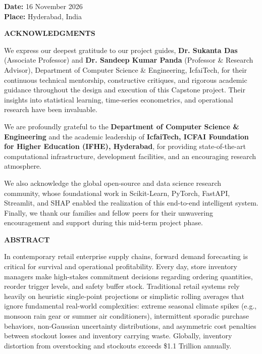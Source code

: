 \documentclass[12pt,a4paper,oneside]{report}
\theoremstyle{definition}
\begin{document}
\vspace{1.5cm}
\noindent \textbf{Date:} 16 November 2026 \\
\textbf{Place:} Hyderabad, India

\newpage
\thispagestyle{plain}
\begin{center}
    {\LARGE \textbf{ACKNOWLEDGMENTS}}\\[1.0cm]
\end{center}

\noindent We express our deepest gratitude to our project guides, \textbf{Dr. Sukanta Das} (Associate Professor) and \textbf{Dr. Sandeep Kumar Panda} (Professor \& Research Advisor), Department of Computer Science \& Engineering, IcfaiTech, for their continuous technical mentorship, constructive critiques, and rigorous academic guidance throughout the design and execution of this Capstone project. Their insights into statistical learning, time-series econometrics, and operational research have been invaluable.

\noindent We are profoundly grateful to the \textbf{Department of Computer Science \& Engineering} and the academic leadership of \textbf{IcfaiTech, ICFAI Foundation for Higher Education (IFHE), Hyderabad}, for providing state-of-the-art computational infrastructure, development facilities, and an encouraging research atmosphere.

\noindent We also acknowledge the global open-source and data science research community, whose foundational work in Scikit-Learn, PyTorch, FastAPI, Streamlit, and SHAP enabled the realization of this end-to-end intelligent system. Finally, we thank our families and fellow peers for their unwavering encouragement and support during this mid-term project phase.

\newpage
\thispagestyle{plain}
\begin{center}
    {\LARGE \textbf{ABSTRACT}}\\[1.0cm]
\end{center}

\noindent In contemporary retail enterprise supply chains, forward demand forecasting is critical for survival and operational profitability. Every day, store inventory managers make high-stakes commitment decisions regarding ordering quantities, reorder trigger levels, and safety buffer stock. Traditional retail systems rely heavily on heuristic single-point projections or simplistic rolling averages that ignore fundamental real-world complexities: extreme seasonal climate spikes (e.g., monsoon rain gear or summer air conditioners), intermittent sporadic purchase behaviors, non-Gaussian uncertainty distributions, and asymmetric cost penalties between stockout losses and inventory carrying waste. Globally, inventory distortion from overstocking and stockouts exceeds \$1.1 Trillion annually.
\end{document}
